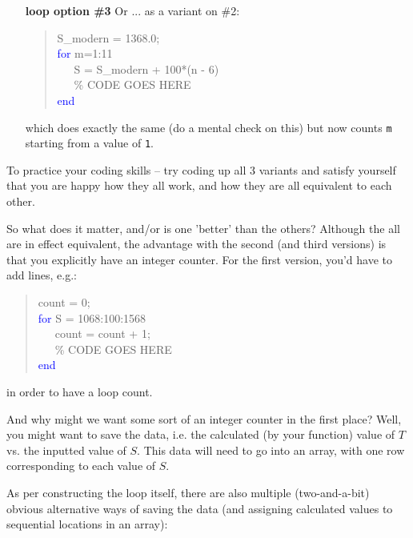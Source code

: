 \documentclass{tufte-book} %
\newenvironment{docspec}{\begin{quotation}\ttfamily\parskip0pt\parindent0pt\ignorespaces}{\end{quotation}}
\begin{document}
\begin{enumerate}
\item [\textbf{loop option \#3}]
Or ... as a variant on \#2:
\begin{docspec}
S\_modern = 1368.0;
\\\textcolor{blue}{for} m=1:11
\\ \ \ \ S = S\_modern + 100*(n - 6)
\\ \ \ \ \textcolor[rgb]{0,0.501961,0}{\% CODE GOES HERE}
\\\textcolor{blue}{end}
\end{docspec}
which does exactly the same (do a mental check on this)  but now counts \texttt{m} starting from a value of \texttt{1}.

\end{enumerate}

\noindent To practice your coding skills -- try coding up all 3 variants and satisfy yourself that you are happy how they all work, and how they are all equivalent to each other.

So what does it matter, and/or is one 'better' than the others? Although the all are  in effect equivalent, the advantage with the second (and third versions) is that you explicitly have an integer counter. For the first version, you'd have to add lines, e.g.:
\begin{docspec}
count = 0;
\\\textcolor{blue}{for} S = 1068:100:1568
\\ \ \ \ count = count + 1;
\\ \ \ \ \textcolor[rgb]{0,0.501961,0}{\% CODE GOES HERE}
\\\textcolor{blue}{end}
\end{docspec}
in order to have a loop count.

And why might we want some sort of an integer counter in the first place? Well, you might want to save the data, i.e. the calculated (by your function) value of \(T\) vs. the inputted value of \(S\). This data will need to go into an array, with one row corresponding to each value of \(S\).

As per constructing the loop itself, there are  also multiple (two-and-a-bit) obvious alternative ways of saving the data (and assigning calculated values to sequential locations in an array):
\end{document}
